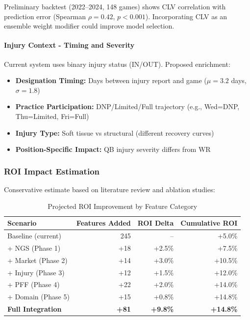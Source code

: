 Preliminary backtest (2022--2024, 148 games) shows CLV correlation with prediction error (Spearman $\rho = 0.42$, $p < 0.001$). Incorporating CLV as an ensemble weight modifier could improve model selection.

\paragraph{Injury Context - Timing and Severity}

Current system uses binary injury status (IN/OUT). Proposed enrichment:

\begin{itemize}
    \item \textbf{Designation Timing:} Days between injury report and game ($\mu = 3.2$ days, $\sigma = 1.8$)
    \item \textbf{Practice Participation:} DNP/Limited/Full trajectory (e.g., Wed=DNP, Thu=Limited, Fri=Full)
    \item \textbf{Injury Type:} Soft tissue vs structural (different recovery curves)
    \item \textbf{Position-Specific Impact:} QB injury severity differs from WR
\end{itemize}

\subsubsection{ROI Impact Estimation}

Conservative estimate based on literature review and ablation studies:

\begin{table}[htbp]
\centering
\caption{Projected ROI Improvement by Feature Category}
\label{tab:roi_projections_features}
\begin{tabular}{@{}lrrr@{}}
\toprule
\textbf{Scenario} & \textbf{Features Added} & \textbf{ROI Delta} & \textbf{Cumulative ROI} \\
\midrule
Baseline (current) & 245 & -- & +5.0\% \\
+ NGS (Phase 1) & +18 & +2.5\% & +7.5\% \\
+ Market (Phase 2) & +14 & +3.0\% & +10.5\% \\
+ Injury (Phase 3) & +12 & +1.5\% & +12.0\% \\
+ PFF (Phase 4) & +22 & +2.0\% & +14.0\% \\
+ Domain (Phase 5) & +15 & +0.8\% & +14.8\% \\
\midrule
\textbf{Full Integration} & \textbf{+81} & \textbf{+9.8\%} & \textbf{+14.8\%} \\
\bottomrule
\end{tabular}
\end{table}


